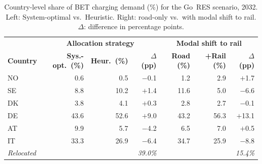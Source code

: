     \begin{table}[H]
    \centering
    \caption{Country-level share of \ac{BET} charging demand (\%) for the Go~RES scenario, 2032. Left: System-optimal vs.\ Heuristic. Right: road-only vs.\ with modal shift to rail. $\Delta$: difference in percentage points.}
    \label{tab:demand_shift}
    \begin{tabular}{@{}l|rrr|rrr@{}}
    \toprule
     & \multicolumn{3}{c|}{\textbf{Allocation strategy}} & \multicolumn{3}{c}{\textbf{Modal shift to rail}} \\
    \textbf{Country} & \textbf{Sys.-opt.\ (\%)} & \textbf{Heur.\ (\%)} & \textbf{$\Delta$ (pp)} & \textbf{Road (\%)} & \textbf{+Rail (\%)} & \textbf{$\Delta$ (pp)} \\ \midrule
      NO &  0.6 &  0.5 & $-$0.1 &  1.2 &  2.9 & $+$1.7 \\
      SE &  8.8 & 10.2 & $+$1.4 & 11.6 &  5.0 & $-$6.6 \\
      DK &  3.8 &  4.1 & $+$0.3 &  2.8 &  2.7 & $-$0.1 \\
      DE & 43.6 & 52.6 & $+$9.0 & 43.2 & 56.3 & $+$13.1 \\
      AT &  9.9 &  5.7 & $-$4.2 &  6.5 &  7.0 & $+$0.5 \\
      IT & 33.3 & 26.9 & $-$6.4 & 34.7 & 25.9 & $-$8.8 \\
      \addlinespace
      \textit{Relocated} & & & \textit{39.0\%} & & & \textit{15.4\%} \\
    \bottomrule
    \end{tabular}
    \end{table}

